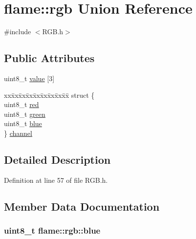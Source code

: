 \hypertarget{unionflame_1_1rgb}{\section{flame\-:\-:rgb Union Reference}
\label{unionflame_1_1rgb}
}


{\ttfamily \#include $<$R\-G\-B.\-h$>$}

\subsection*{Public Attributes}
\begin{DoxyCompactItemize}
\item 
uint8\-\_\-t \hyperlink{unionflame_1_1rgb_a0a54852e8a0ef4113a1bdbc19c558008}{value} \mbox{[}3\mbox{]}
\item 
\begin{tabbing}
xx\=xx\=xx\=xx\=xx\=xx\=xx\=xx\=xx\=\kill
struct \{\\
\>uint8\_t \hyperlink{unionflame_1_1rgb_aff02b9e474353728fa5d75ebe72a3054}{red}\\
\>uint8\_t \hyperlink{unionflame_1_1rgb_ac6314c6f3c99686284bfa185573b3e61}{green}\\
\>uint8\_t \hyperlink{unionflame_1_1rgb_a71222b578c6f9b2609a41756eff39ba2}{blue}\\
\} \hyperlink{unionflame_1_1rgb_a796ab03a8c63b315b7d60d3f87196370}{channel}\\

\end{tabbing}\end{DoxyCompactItemize}


\subsection{Detailed Description}


Definition at line 57 of file R\-G\-B.\-h.



\subsection{Member Data Documentation}
\hypertarget{unionflame_1_1rgb_a71222b578c6f9b2609a41756eff39ba2}{
\subsubsection[{blue}]{\setlength{\rightskip}{0pt plus 5cm}uint8\-\_\-t flame\-::rgb\-::blue}}\label{unionflame_1_1rgb_a71222b578c6f9b2609a41756eff39ba2}


